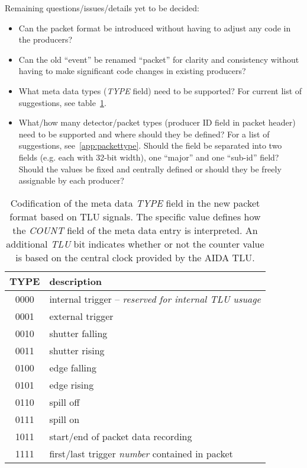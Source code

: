 \documentclass[paper=a4, fontsize=11pt, titlepage]{scrartcl}	%
\numberwithin{equation}{section}		%
\numberwithin{figure}{section}			%
\numberwithin{table}{section}           	%
\begin{document}
Remaining questions/issues/details yet to be decided:
\begin{itemize}
\item Can the packet format be introduced without having to adjust any
  code in the producers?
\item Can the old ``event'' be renamed ``packet'' for clarity and
  consistency without having to make significant code changes in
  existing producers?
\item What meta data types (\emph{TYPE} field) need to be supported?
  For current list of suggestions, see table~\ref{tab:typefield}.
\item What/how many detector/packet types (producer ID field in packet
  header) need to be supported and where should they be defined? For a list of suggestions,
  see~\ref{app:packettype}. Should the field be separated into two
  fields (e.g. each with 32-bit width), one ``major'' and one
  ``sub-id'' field? Should the values be fixed and centrally defined
  or should they be freely assignable by each producer?
\end{itemize}

  \begin{table}[htbp]
    \centering
    \begin{tabular}{cl}
    \toprule
    \textbf{TYPE} & \textbf{description} \\
    \midrule
    0000 &  internal trigger -- \emph{reserved for internal TLU usuage}\\
    0001 &  external trigger\\
    0010 &  shutter falling \\
    0011 &  shutter rising  \\
    0100 &  edge falling    \\
    0101 &  edge rising     \\
    0110 &  spill off       \\
    0111 &  spill on        \\
    1011 & start/end of packet data recording \\
    1111 & first/last trigger \emph{number} contained in packet \\
    \bottomrule
  \end{tabular}
  \caption{Codification of the meta data \emph{TYPE} field in the new
    packet format based on TLU signals\cite{tlu2014}. The specific
    value defines how the \emph{COUNT} field of the meta data entry is
    interpreted. An additional \emph{TLU} bit indicates whether or not the counter value
    is based on the central clock provided by the AIDA TLU.}
\label{tab:typefield}
\end{table}
\end{document}
